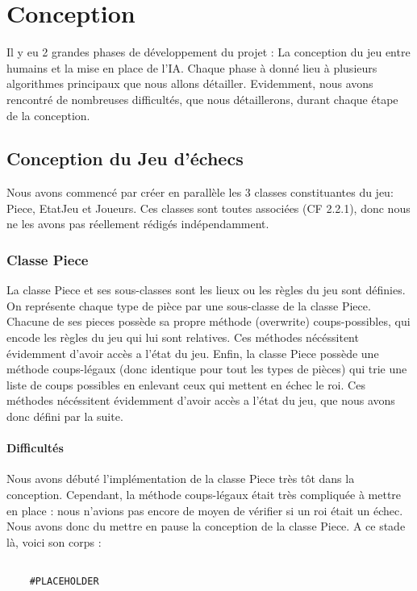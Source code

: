 \documentclass{article}
\begin{document}
\section{Conception}
Il y eu 2 grandes phases de développement du projet : La conception du jeu entre humains
et la mise en place de l'IA. Chaque phase à donné lieu à plusieurs algorithmes principaux que nous allons détailler.
Evidemment, nous avons rencontré de nombreuses difficultés, que nous détaillerons, durant chaque étape de la conception.

\subsection{Conception du Jeu d'échecs}
Nous avons commencé par créer en parallèle les 3 classes constituantes du jeu:
Piece, EtatJeu et Joueurs. Ces classes sont toutes associées (CF 2.2.1), donc
nous ne les avons pas réellement rédigés indépendamment.
\subsubsection{Classe Piece}
La classe Piece et ses sous-classes sont les lieux ou les règles du jeu sont définies.
On représente chaque type de pièce par une sous-classe de la classe Piece.
Chacune de ses pieces possède sa propre méthode (overwrite) coups-possibles, qui encode les règles du jeu
qui lui sont relatives. Ces méthodes nécéssitent évidemment d'avoir accès a l'état du jeu.
Enfin, la classe Piece possède une méthode coups-légaux (donc identique pour tout les types de pièces)
qui trie une liste de coups possibles en enlevant ceux qui mettent en échec le roi.
Ces méthodes nécéssitent évidemment d'avoir accès a l'état du jeu, que nous avons donc défini par la suite.
\paragraph{Difficultés}
Nous avons débuté  l'implémentation de la classe Piece très tôt dans la conception. Cependant, la méthode 
coups-légaux était très compliquée à mettre en place : nous n'avions pas encore
de moyen de vérifier si un roi était un échec. Nous avons donc du mettre en pause
la conception de la classe Piece. A ce stade là, voici son corps : 


\begin{verbatim}

    #PLACEHOLDER
\end{verbatim}
\end{document}
